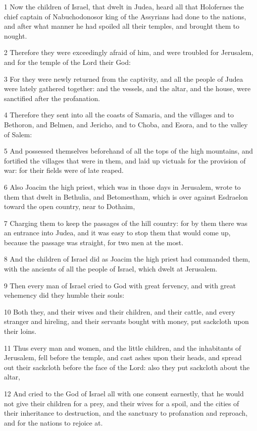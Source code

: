 \par 1 Now the children of Israel, that dwelt in Judea, heard all that Holofernes the chief captain of Nabuchodonosor king of the Assyrians had done to the nations, and after what manner he had spoiled all their temples, and brought them to nought.
\par 2 Therefore they were exceedingly afraid of him, and were troubled for Jerusalem, and for the temple of the Lord their God:
\par 3 For they were newly returned from the captivity, and all the people of Judea were lately gathered together: and the vessels, and the altar, and the house, were sanctified after the profanation.
\par 4 Therefore they sent into all the coasts of Samaria, and the villages and to Bethoron, and Belmen, and Jericho, and to Choba, and Esora, and to the valley of Salem:
\par 5 And possessed themselves beforehand of all the tops of the high mountains, and fortified the villages that were in them, and laid up victuals for the provision of war: for their fields were of late reaped.
\par 6 Also Joacim the high priest, which was in those days in Jerusalem, wrote to them that dwelt in Bethulia, and Betomestham, which is over against Esdraelon toward the open country, near to Dothaim,
\par 7 Charging them to keep the passages of the hill country: for by them there was an entrance into Judea, and it was easy to stop them that would come up, because the passage was straight, for two men at the most.
\par 8 And the children of Israel did as Joacim the high priest had commanded them, with the ancients of all the people of Israel, which dwelt at Jerusalem.
\par 9 Then every man of Israel cried to God with great fervency, and with great vehemency did they humble their souls:
\par 10 Both they, and their wives and their children, and their cattle, and every stranger and hireling, and their servants bought with money, put sackcloth upon their loins.
\par 11 Thus every man and women, and the little children, and the inhabitants of Jerusalem, fell before the temple, and cast ashes upon their heads, and spread out their sackcloth before the face of the Lord: also they put sackcloth about the altar,
\par 12 And cried to the God of Israel all with one consent earnestly, that he would not give their children for a prey, and their wives for a spoil, and the cities of their inheritance to destruction, and the sanctuary to profanation and reproach, and for the nations to rejoice at.
